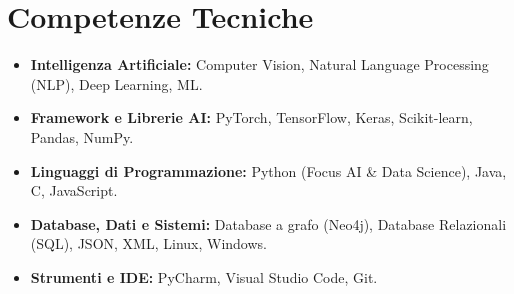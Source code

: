 \documentclass[11pt, a4paper]{article}
\begin{document}
\section{Competenze Tecniche}
\begin{itemize}
    \item \textbf{Intelligenza Artificiale:} Computer Vision, Natural Language Processing (NLP), Deep Learning, ML.
    \item \textbf{Framework e Librerie AI:} PyTorch, TensorFlow, Keras, Scikit-learn, Pandas, NumPy.
    \item \textbf{Linguaggi di Programmazione:} Python (Focus AI \& Data Science), Java, C, JavaScript.
    \item \textbf{Database, Dati e Sistemi:} Database a grafo (Neo4j), Database Relazionali (SQL), JSON, XML, Linux, Windows.
    \item \textbf{Strumenti e IDE:} PyCharm, Visual Studio Code, Git.
\end{itemize}

\end{document}
